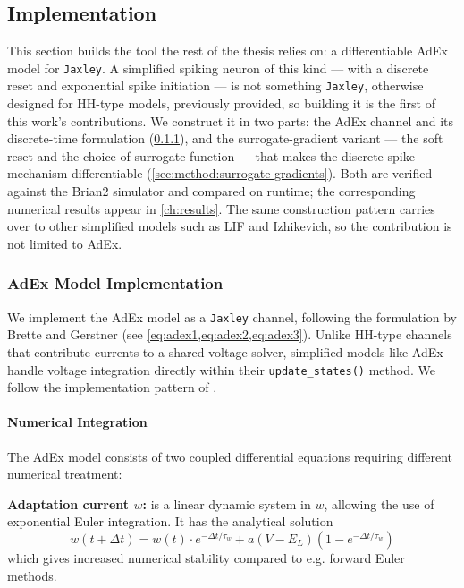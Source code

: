 \subsection{Implementation}\label{ch:implementation}

This section builds the tool the rest of the thesis relies on: a differentiable \gls{AdEx} model for \texttt{Jaxley}.
A simplified spiking neuron of this kind --- with a discrete reset and exponential spike initiation --- is not something \texttt{Jaxley}, otherwise designed for \gls{HH}-type models, previously provided, so building it is the first of this work's contributions.
We construct it in two parts: the \gls{AdEx} channel and its discrete-time formulation (\cref{sec:method:adex_impl}), and the surrogate-gradient variant --- the soft reset and the choice of surrogate function --- that makes the discrete spike mechanism differentiable (\cref{sec:method:surrogate-gradients}).
Both are verified against the Brian2 simulator and compared on runtime; the corresponding numerical results appear in \cref{ch:results}.
The same construction pattern carries over to other simplified models such as \gls{LIF} and Izhikevich, so the contribution is not limited to \gls{AdEx}.


\subsubsection{AdEx Model Implementation}\label{sec:method:adex_impl}
We implement the \gls{AdEx} model as a \texttt{Jaxley} channel, following the formulation by Brette and Gerstner \cite{Brette2005} (see \cref{eq:adex1,eq:adex2,eq:adex3}).
Unlike \gls{HH}-type channels that contribute currents to a shared voltage solver, simplified models like \gls{AdEx} handle voltage integration directly within their \texttt{update\_states()} method.
We follow the implementation pattern of \cite{Deistler2025}.

\paragraph{Numerical Integration}\label{sec:method:adex:numerics}
The \gls{AdEx} model consists of two coupled differential equations requiring different numerical treatment:

\textbf{Adaptation current $w$:}
 is a linear dynamic system in $w$, allowing the use of exponential Euler integration.
It has the analytical solution
\begin{equation}\label{eq:adaptation-current-integration}
  w(t+\Delta t) = w(t) \cdot e^{-\Delta t / \tau_w} + a(V - E_L)(1 - e^{-\Delta t / \tau_w})
\end{equation}
which gives increased numerical stability compared to e.g. forward Euler methods.

